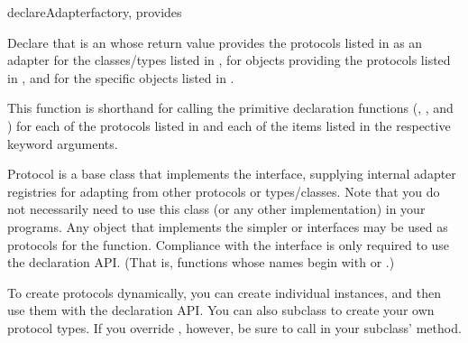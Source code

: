 \begin{verbatim%
}
\begin{verbatim%
}
\begin{verbatim%
}
\begin{verbatim%
}
\begin{funcdesc}{declareAdapter}{factory, provides
 
}

Declare that  is an  whose return value
provides the protocols listed in  as an adapter for the
classes/types listed in , for objects providing the protocols
listed in , and for the specific objects listed in
.

This function is shorthand for calling the primitive declaration
functions (,
, and )
for each of the protocols listed in  and each of the
items listed in the respective keyword arguments.
\end{funcdesc}

























\begin{classdesc*}{Protocol}
 is a base class that implements the 
interface, supplying internal adapter registries for adapting from other
protocols or types/classes.  Note that you do not necessarily need to use this
class (or any other  implementation) in
your programs.  Any object that implements the simpler  or
 interfaces may be used as protocols for the
 function.  Compliance with the 
interface is only required to use the  declaration API.
(That is, functions whose names begin with  or .)

To create protocols dynamically, you can create individual 
instances, and then use them with the declaration API.  You can also subclass
 to create your own protocol types.  If you override
, however, be sure to call 
in your subclass'  method.
\end{classdesc*}



\end{verbatim%
}
\end{verbatim%
}
\end{verbatim%
}
\end{verbatim%
}
